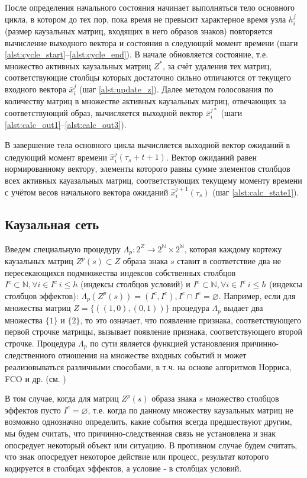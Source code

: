 \documentclass[12pt]{scrartcl}
\begin{document}
	После определения начального состояния начинает выполняться тело основного цикла, в котором до тех пор, пока время не превысит характерное время узла $h_i^j$ (размер каузальных матриц, входящих в него образов знаков) повторяется вычисление выходного вектора и состояния в следующий момент времени (шаги \ref{alst:cycle_start}--\ref{alst:cycle_end}). В начале обновляется состояние, т.е. множество активных каузальных матриц $Z^*$, за счёт удаления тех матриц, соответствующие столбцы которых достаточно сильно отличаются от текущего входного вектора $\bar x_i^j$ (шаг \ref{alst:update_z}). Далее методом голосования по количеству матриц в множестве активных каузальных матриц, отвечающих за соответствующий образ, вычисляется выходной вектор $\bar x_i^{j*}$ (шаги \ref{alst:calc_out1}--\ref{alst:calc_out3}).

	
	В завершение тела основного цикла вычисляется выходной вектор ожиданий в следующий момент времени $\hat x_i^j(\tau_s+t+1)$. Вектор ожиданий равен нормированному вектору, элементы которого равны сумме элементов столбцов всех активных кауазальных матриц, соответствующих текущему моменту времени с учётом весов начального вектора ожиданий $\hat x_i^{j+1}(\tau_s)$ (шаг \ref{alst:calc_state1}).

	\subsection{Каузальная сеть}
	
	Введем специальную процедуру $\Lambda_p: 2^Z\rightarrow 2^{\mathbb N}\times 2^{\mathbb N}$, которая каждому кортежу каузальных матриц $Z^p(s)\subset Z$ образа знака $s$ ставит в соответствие два не пересекающихся подмножества индексов собственных столбцов $I^c\subset\mathbb N, \forall i\in I^c\ i\leq h$ (индексы столбцов условий) и $I^e\subset\mathbb N, \forall i\in I^e\ i\leq h$ (индексы столбцов эффектов): $\Lambda_p(Z^p(s))=(I^c,I^e), I^c\cap I^e=\varnothing$. Например, если для множества матриц $Z=\{((1, 0), (0, 1))\}$ процедура $\Lambda_p$ выдает два множества $\{1\}$ и $\{2\}$, то это означает, что появление признака, соответствующего первой строчке матрицы, вызывает появление признака, соответствующего второй строчке. Процедура $\Lambda_p$ по сути является функцией установления причинно-следственного отношения на множестве входных событий и может реализовываться различными способами, в т.ч. на основе алгоритмов Норриса, FCO и др. (см. \cite{Kuznetsov2001})
	

	В том случае, когда для матриц $Z^p(s)$ образа знака $s$ множество столбцов эффектов пусто $I^e=\varnothing$, т.е. когда по данному множеству каузальных матриц не возможно однозначно определить, какие события всегда предшествуют другим, мы будем считать, что причинно-следственная связь не установлена и знак опосредует некоторый объект или ситуацию. В противном случае будем считать, что знак опосредует некоторое действие или процесс, результат которого кодируется в столбцах эффектов, а условие - в столбцах условий. 
\end{document}
